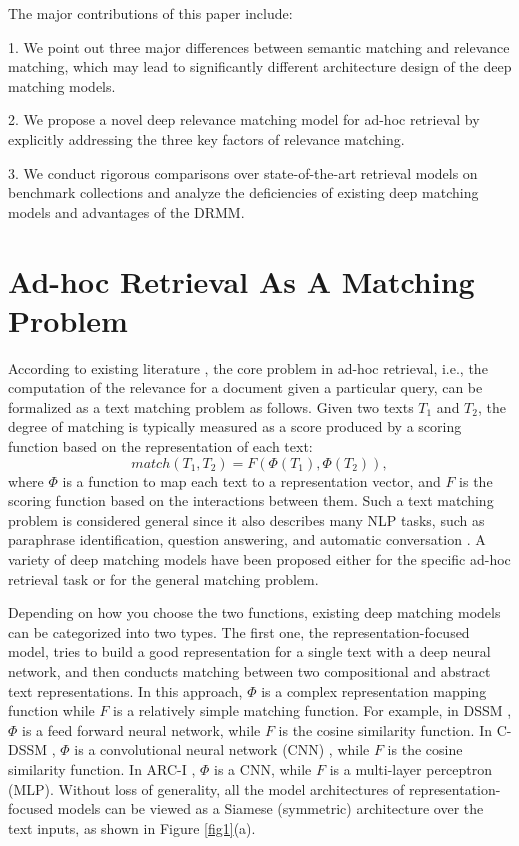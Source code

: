 \documentclass{sig-alternate-05-2015}
\begin{document}
The major contributions of this paper include:
\begin{description}
\item{1.} We point out three major differences between semantic matching and relevance matching, which may lead to significantly different architecture design of the deep matching models.
\item{2.} We propose a novel deep relevance matching model for ad-hoc retrieval by explicitly addressing the three key factors of relevance matching.
\item{3.} We conduct rigorous comparisons over state-of-the-art retrieval models on benchmark collections and analyze the deficiencies of existing deep matching models and advantages of the DRMM.
\end{description}



\section{Ad-hoc Retrieval As A Matching Problem}
According to existing literature \cite{huang2013learning,lu2013deep}, the core problem in ad-hoc retrieval, i.e., the computation of the relevance for a document given a particular query, can be formalized as a text matching problem as follows. Given two texts $T_1$ and $T_2$, the degree of matching is typically measured as a score produced by a scoring function based on the representation of each text:
\begin{displaymath}
match(T_1,T_2)=F(\Phi(T_1),\Phi(T_2)),
\end{displaymath}
where $\Phi$ is a function to map each text to a representation vector, and $F$ is the scoring function based on the interactions between them. Such a text matching problem is considered general since it also describes many NLP tasks, such as paraphrase identification, question answering, and automatic conversation \cite{lu2013deep,hu2014convolutional}. A variety of deep matching models have been proposed either for the specific ad-hoc retrieval task or for the general matching problem.

Depending on how you choose the two functions, existing deep matching models can be categorized into two types. The first one, the representation-focused model, tries to build a good representation for a single text with a deep neural network, and then conducts matching between two compositional and abstract text representations. In this approach, $\Phi$ is a complex representation mapping function while $F$ is a relatively simple matching function. For example, in DSSM \cite{huang2013learning}, $\Phi$ is a feed forward neural network, while $F$ is the cosine similarity function. In C-DSSM \cite{shen2014learning,gao2015modeling}, $\Phi$ is a convolutional neural network (CNN) \cite{lecun1995convolutional}, while $F$ is the cosine similarity function. In ARC-I \cite{hu2014convolutional}, $\Phi$ is a CNN, while $F$ is a multi-layer perceptron (MLP). Without loss of generality, all the model architectures of representation-focused models can be viewed as a Siamese (symmetric) architecture over the text inputs, as shown in Figure \ref{fig1}(a).
\end{document}
